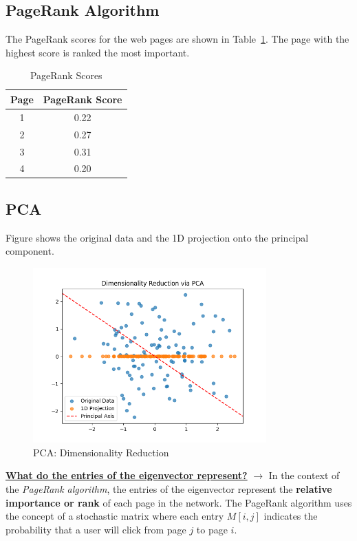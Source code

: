 \documentclass[a4paper,12pt]{article}
\begin{document}
\subsection{PageRank Algorithm}
The PageRank scores for the web pages are shown in Table~\ref{table:pagerank}. The page with the highest score is ranked the most important.

\begin{table}[h!]
\centering
\begin{tabular}{|c|c|}
\hline
Page & PageRank Score \\ \hline
1    & 0.22           \\ \hline
2    & 0.27           \\ \hline
3    & 0.31           \\ \hline
4    & 0.20           \\ \hline
\end{tabular}
\caption{PageRank Scores}
\label{table:pagerank}
\end{table}

\subsection{PCA}
Figure shows the original data and the 1D projection onto the principal component.

\begin{figure}[H]
\centering
\includegraphics[width=0.8\textwidth]{results/pca_plot.png}
\caption{PCA: Dimensionality Reduction}
\label{fig:pca}
\end{figure}

\textbf{\underline{What do the entries of the eigenvector represent?}} $\longrightarrow$
In the context of the \textit{PageRank algorithm}, the entries of the eigenvector represent the \textbf{relative importance or rank} of each page in the network. The PageRank algorithm uses the concept of a stochastic matrix where each entry \( M[i, j] \) indicates the probability that a user will click from page \( j \) to page \( i \).
\end{document}

